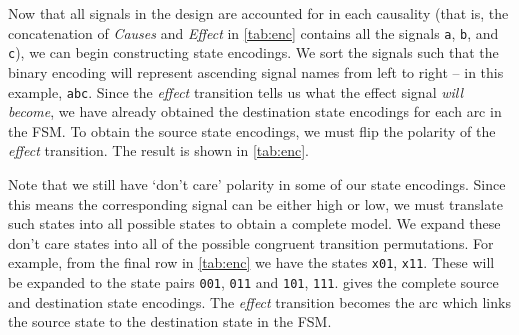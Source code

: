 Now that all signals in the design are accounted for in each causality (that is, the concatenation of \emph{Causes} and \emph{Effect} in \cref{tab:enc} contains all the signals \texttt{a}, \texttt{b}, and \texttt{c}), we can begin constructing state encodings.
We sort the signals such that the binary encoding will represent ascending signal names from left to right -- in this example, \texttt{abc}.
Since the \emph{effect} transition tells us what the effect signal \emph{will become}, we have already obtained the destination state encodings for each arc in the FSM\@.
To obtain the source state encodings, we must flip the polarity of the \emph{effect} transition.
The result is shown in \cref{tab:enc}.

Note that we still have `don't care' polarity in some of our state encodings.
Since this means the corresponding signal can be either high or low, we must translate such states into all possible states to obtain a complete model\@.
We expand these don't care states into all of the possible congruent transition permutations.
For example, from the final row in \cref{tab:enc} we have the states \texttt{x01}, \texttt{x11}.
These will be expanded to the state pairs \texttt{001}, \texttt{011} and \texttt{101}, \texttt{111}.
 gives the complete source and destination state encodings.
The \emph{effect} transition becomes the arc which links the source state to the destination state in the FSM\@.

